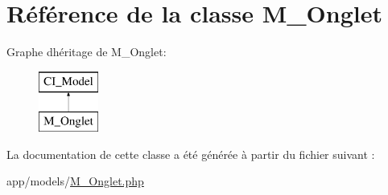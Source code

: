 \hypertarget{class_m___onglet}{}\section{Référence de la classe M\+\_\+\+Onglet}
\label{class_m___onglet}
Graphe d\textquotesingle{}héritage de M\+\_\+\+Onglet\+:\begin{figure}[H]
\begin{center}
\leavevmode
\includegraphics[height=2.000000cm]{class_m___onglet}
\end{center}
\end{figure}


La documentation de cette classe a été générée à partir du fichier suivant \+:\begin{DoxyCompactItemize}
\item 
app/models/\hyperlink{_m___onglet_8php}{M\+\_\+\+Onglet.\+php}\end{DoxyCompactItemize}
